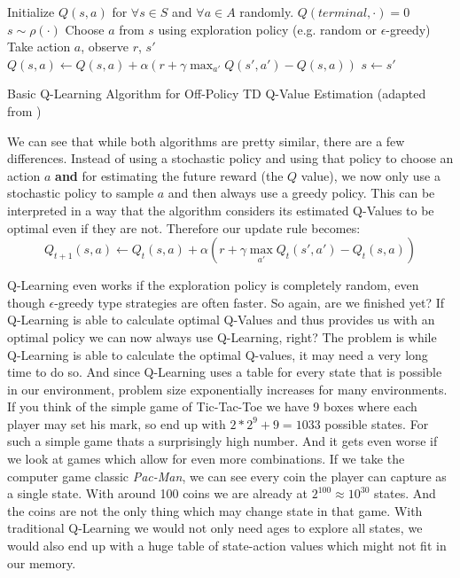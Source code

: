 \begin{algorithm}[ht]
  Initialize $Q(s, a)$ for $\forall s \in S$ and $\forall a \in A$ randomly. $Q(terminal, \cdot) = 0$ \;
   {
   $s \sim \rho(\cdot)$ \;
     {
    Choose $a$ from $s$ using exploration policy (e.g. random or $\epsilon$-greedy) \;
     Take action $a$, observe $r$, $s'$ \;
     $Q(s, a) \leftarrow Q(s, a) + \alpha (r + \gamma\max_{a'} Q(s', a') - Q(s, a))$ \;
     $s \leftarrow s'$\;
   }
 }
  \caption[The Q-Learning Algorithm]{Basic Q-Learning Algorithm for Off-Policy TD Q-Value Estimation (adapted from \cite{sutton2018reinforcement})}\label{alg:QLearning}
 \end{algorithm}

We can see that while both algorithms are pretty similar, there are a few differences. Instead of using a stochastic policy and using that policy to choose an action $a$ \textbf{and} for estimating the future reward (the $Q$ value), we now only use a stochastic policy to sample $a$ and then always use a greedy policy. This can be interpreted in a way that the algorithm considers its estimated Q-Values to be optimal even if they are not. Therefore our update rule becomes: 
\[Q_{t+1}(s, a) \leftarrow Q_t(s, a) + \alpha (r + \gamma\max_{a'} Q_t(s', a') - Q_t(s, a))\]

Q-Learning even works if the exploration policy is completely random, even though $\epsilon$-greedy type strategies are often faster. So again, are we finished yet? If Q-Learning is able to calculate optimal Q-Values and thus provides us with an optimal policy we can now always use Q-Learning, right? The problem is while Q-Learning is able to calculate the optimal Q-values, it may need a very long time to do so. And since Q-Learning uses a table for every state that is possible in our environment, problem size exponentially increases for many environments. \\
If you think of the simple game of Tic-Tac-Toe we have 9 boxes where each player may set his mark, so end up with $2*2^9+9=1033$ possible states. For such a simple game thats a surprisingly high number. And it gets even worse if we look at games which allow for even more combinations. If we take the computer game classic \textit{Pac-Man}, we can see every coin the player can capture as a single state. With around 100 coins we are already at $2^{100} \approx 10^{30}$ states. And the coins are not the only thing which may change state in that game. With traditional Q-Learning we would not only need ages to explore all states, we would also end up with a huge table of state-action values which might not fit in our memory. \\


